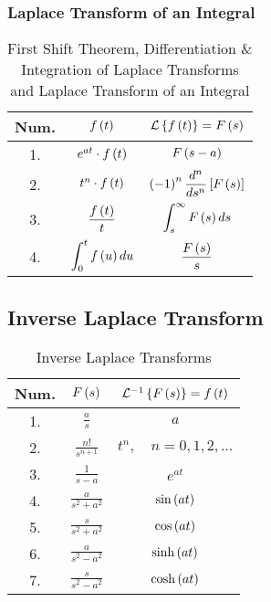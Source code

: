 \subsubsection{Laplace Transform of an Integral}
\begin{table}[H]
    \centering
    \renewcommand{\arraystretch}{2.4}
    \caption{First Shift Theorem, Differentiation \& Integration of Laplace Transforms and Laplace Transform of an Integral}
    \label{table:2.2}
    \begin{tabular}{|c|c|c|}\hline
       Num.&$f\left(t\right)$&$\mathcal{L}\left\{f\left(t\right)\right\}=F\left(s\right)$\\\hline
       1.&$e^{at}\cdot f\left(t\right)$&$F\left(s-a\right)$\\
       2.&$t^n\cdot f\left(t\right)$&$\displaystyle\left(-1\right)^n\frac{d^n}{ds^n}\left[F\left(s\right)\right]$\\
       3.&$\displaystyle\frac{f\left(t\right)}{t}$&$\displaystyle\int_{s}^{\infty}F\left(s\right)ds$\\
       4.&$\displaystyle\int_{0}^{t}f\left(u\right)du$&$\displaystyle\frac{F\left(s\right)}{s}$\\\hline
    \end{tabular}
\end{table}
\subsection{Inverse Laplace Transform}
\begin{table}[H]
    \centering
    \renewcommand{\arraystretch}{2.2}
    \caption{Inverse Laplace Transforms}
    \label{table:2.3}
    \begin{tabular}{|c|c|c|}\hline
       Num.&$F\left(s\right)$&$\mathcal{L}^{-1}\left\{F\left(s\right)\right\}=f\left(t\right)$\\\hline
       1.&$\displaystyle\frac{a}{s}$&$a$\\
       2.&$\displaystyle\frac{n!}{s^{n+1}}$&$t^n,\quad n=0,1,2,...$\\
       3.&$\displaystyle\frac{1}{s-a}$&$e^{at}$\\
       4.&$\displaystyle\frac{a}{s^2+a^2}$&$\sin\left(at\right)$\\
       5.&$\displaystyle\frac{s}{s^2+a^2}$&$\cos\left(at\right)$\\
       6.&$\displaystyle\frac{a}{s^2-a^2}$&$\sinh{\left(at\right)}$\\
       7.&$\displaystyle\frac{s}{s^2-a^2}$&$\cosh{\left(at\right)}$\\\hline
    \end{tabular}
\end{table}
